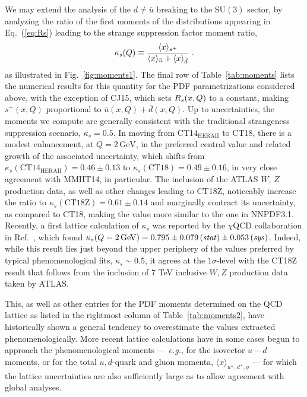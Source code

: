 We may extend the analysis of the $\overline{d} \neq \overline{u}$ breaking to the $\mathrm{SU}(3)$ sector, by
analyzing the ratio of the first moments of the distributions appearing in Eq.~(\ref{eq:Rs}) leading to the
strange suppression factor moment ratio,
\begin{equation}
	\kappa_s(Q) \equiv \frac{\langle x \rangle_{s^+}}{\langle x \rangle_{\bar{u}} + \langle x \rangle_{\bar{d}}}\ .
\label{eq:str-supp}
\end{equation}
as illustrated in Fig.~\ref{fig:moments1}. The final row of Table~\ref{tab:moments} lists the numerical results for this quantity 
for the PDF parametrizations considered above, with the exception of
CJ15, which sets $R_s(x,Q)$ to a constant, making $s^+(x,Q)$
proportional to $\overline{u}(x,Q) + \overline{d}(x,Q)$.
Up to uncertainties, the moments we compute are generally consistent with the traditional strangeness suppression scenario,
$\kappa_s\! =\! 0.5$. In moving from CT14$_\mathrm{HERAII}$ to CT18, there is a modest enhancement, at $Q = 2\,\mathrm{GeV}$, in the preferred central
value and related growth of the associated uncertainty, which shifts from $\kappa_s({\mathrm{CT14}_\mathrm{HERAII}})\! =\! 0.46\! \pm\! 0.13$
  to $\kappa_s(\mathrm{CT18})\! =\! 0.49\! \pm\! 0.16$, in very close agreement with MMHT14, in particular. The inclusion of the ATLAS $W,\, Z$ production data, as well as other changes leading to CT18Z, noticeably increase the ratio
  to $\kappa_s(\mathrm{CT18Z})\! =\! 0.61\! \pm\! 0.14$ and marginally contract its uncertainty, as compared to CT18, making the value more similar to the one in NNPDF3.1.
Recently, a first lattice calculation of $\kappa_s$ was reported by the $\chi$QCD collaboration in
Ref.~\cite{Liang:2019xdx}, which found $\kappa_s(Q = 2\,\mathrm{GeV}) = 0.795 \pm 0.079\, (\mathit{stat}) \pm 0.053\, (\mathit{sys})$.
Indeed, while this result lies just beyond the upper periphery of the values preferred by typical phenomenological fits,
$\kappa_s \sim 0.5$, it agrees at the $1\sigma$-level with the CT18Z result that follows from the inclusion of 7 TeV inclusive $W,Z$
production data taken by ATLAS.

This, as well as other entries for the PDF moments determined
on the QCD lattice as listed in the rightmost column of Table~\ref{tab:moments2}, have historically shown a general tendency to overestimate
the values extracted phenomenologically. More recent lattice calculations have in some cases begun to 
approach the phenomenological moments ---
{\it e.g.}, for the isovector $u\!-\!d$ moments, or for the total $u, d$-quark and gluon momenta, $\langle x \rangle_{u^+,d^+,g}$ --- for which the
lattice uncertainties are also sufficiently large as to allow agreement with global analyses.

